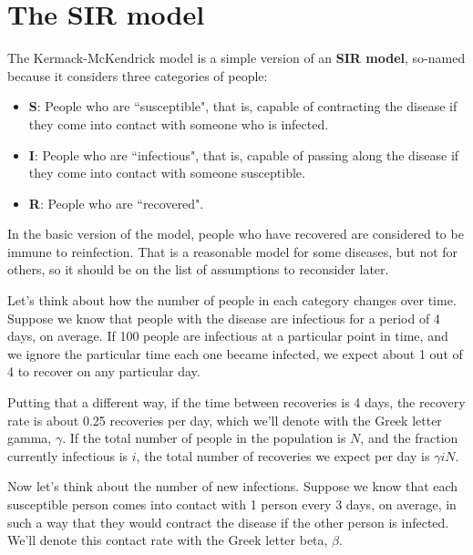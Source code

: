 \documentclass[12pt]{book}
\theoremstyle{exercise}
\begin{document}
\section{The SIR model}

The Kermack-McKendrick model is a simple version of an {\bf SIR model}, so-named because it considers three categories of people:

\begin{itemize}

\item {\bf S}: People who are ``susceptible", that is, capable of contracting the disease if they come into contact with someone who is infected.

\item {\bf I}: People who are ``infectious", that is, capable of passing along the disease if they come into contact with someone susceptible.

\item {\bf R}: People who are ``recovered".

\end{itemize}
 
In the basic version of the model, people who have recovered are considered to be immune to reinfection.  That is a reasonable model for some diseases, but not for others, so it should be on the list of assumptions to reconsider later.

Let's think about how the number of people in each category changes over time.  Suppose we know that people with the disease are infectious for a period of 4 days, on average.  If 100 people are infectious at a particular point in time, and we ignore the particular time each one became infected, we expect about 1 out of 4 to recover on any particular day.

Putting that a different way, if the time between recoveries is 4 days, the recovery rate is about 0.25 recoveries per day, which we'll denote with the Greek letter gamma, $\gamma$.  If the total number of people in the population is $N$, and the fraction currently infectious is $i$, the total number of recoveries we expect per day is $\gamma i N$.

Now let's think about the number of new infections.  Suppose we know that each susceptible person comes into contact with 1 person every 3 days, on average, in such a way that they would contract the disease if the other person is infected.  We'll denote this contact rate with the Greek letter beta, $\beta$.
\end{document}
